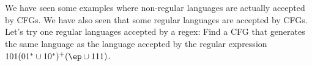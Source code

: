 We have seen some examples where non-regular languages are actually accepted
by CFGs.
We have also seen that some regular languages are accepted by CFGs.
Let's try one regular languages accepted by a regex:
Find a CFG that generates the same language as the language accepted by 
the regular expression $101(01^* \cup 10^*)^+(\ep \cup 111)$.
